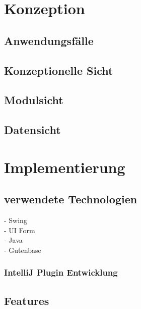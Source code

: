 \section{Konzeption}

\subsection{Anwendungsfälle}
\subsection{Konzeptionelle Sicht}
\subsection{Modulsicht}
\subsection{Datensicht}



\section{Implementierung}
\subsection{verwendete Technologien}
- Swing \\
- UI Form \\
- Java\\
- Gutenbase
\subsubsection{IntelliJ Plugin Entwicklung}

\subsection{Features}


